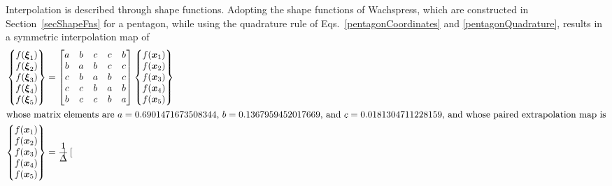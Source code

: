     Interpolation is described through shape functions.  Adopting the shape functions of Wachspress, which are constructed in Section~\ref{secShapeFns} for a pentagon, while using the quadrature rule of Eqs.~\ref{pentagonCoordinates} and \ref{pentagonQuadrature}, results in a symmetric interpolation map of
    \begin{subequations}
        \label{extrapolationPentagon}
        \begin{align} 
        \left\{ \begin{matrix}
        f ( \boldsymbol{\xi}_1 ) \\ 
        f ( \boldsymbol{\xi}_2 ) \\ 
        f ( \boldsymbol{\xi}_3 ) \\ 
        f ( \boldsymbol{\xi}_4 ) \\ 
        f ( \boldsymbol{\xi}_5 )
        \end{matrix} \right\} & = \begin{bmatrix}
        a & b & c & c & b \\
        b & a & b & c & c \\
        c & b & a & b & c \\
        c & c & b & a & b \\
        b & c & c & b & a
        \end{bmatrix} 
        \left\{ \begin{matrix} 
        f ( \boldsymbol{x}_1 ) \\ 
        f ( \boldsymbol{x}_2 ) \\ 
        f ( \boldsymbol{x}_3 ) \\
        f ( \boldsymbol{x}_4 ) \\
        f ( \boldsymbol{x}_5 )
        \end{matrix} \right\} \\
        \intertext{whose matrix elements are $a = 0.6901471673508344$, $b = 0.1367959452017669$, and $c = 0.0181304711228159$, and whose paired extrapolation map is}
        \left\{ \begin{matrix} 
        f ( \boldsymbol{x}_1 ) \\ 
        f ( \boldsymbol{x}_2 ) \\ 
        f ( \boldsymbol{x}_3 ) \\
        f ( \boldsymbol{x}_4 ) \\
        f ( \boldsymbol{x}_5 )
        \end{matrix} \right\} & = \frac{1}{\Delta} \begin{bmatrix}

\end{bmatrix}
\end{align}
\end{subequations}

